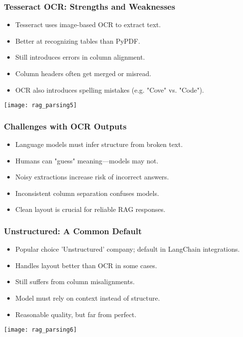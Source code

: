 \begin{frame}[fragile]\frametitle{Tesseract OCR: Strengths and Weaknesses}

  \begin{itemize}
    \item Tesseract uses image-based OCR to extract text.
    \item Better at recognizing tables than PyPDF.
    \item Still introduces errors in column alignment.
    \item Column headers often get merged or misread.
    \item OCR also introduces spelling mistakes (e.g. "Cove" vs. "Code").
  \end{itemize}

    \begin{center}
      \texttt{[image: rag\_parsing5]}
    \end{center}
 
\end{frame}

\begin{frame}[fragile]\frametitle{Challenges with OCR Outputs}
  \begin{itemize}
    \item Language models must infer structure from broken text.
    \item Humans can "guess" meaning—models may not.
    \item Noisy extractions increase risk of incorrect answers.
    \item Inconsistent column separation confuses models.
    \item Clean layout is crucial for reliable RAG responses.
  \end{itemize}
\end{frame}

\begin{frame}[fragile]\frametitle{Unstructured: A Common Default}

  \begin{itemize}
    \item Popular choice 'Unstructured' company; default in LangChain integrations.
    \item Handles layout better than OCR in some cases.
    \item Still suffers from column misalignments.
    \item Model must rely on context instead of structure.
    \item Reasonable quality, but far from perfect.
  \end{itemize}

    \begin{center}
      \texttt{[image: rag\_parsing6]}
    \end{center}

\end{frame}

